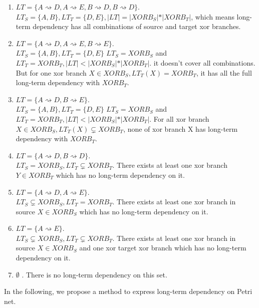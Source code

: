 \begin{enumerate}
	\item $LT=\{ A\rightsquigarrow D, A\rightsquigarrow E, B\rightsquigarrow D, B\rightsquigarrow D\}$. \\
	$LT_S = \{A,B\}, LT_T=\{D,E\}, \vert LT \vert = \vert XORB_S \vert * \vert XORB_T \vert  $, which means long-term dependency has all combinations of source and target xor branches. 
	\item $LT=\{ A\rightsquigarrow D, A\rightsquigarrow E, B\rightsquigarrow E\}. $\\
	$LT_S = \{A,B\}, LT_T=\{D,E\}$
	$LT_S = XORB_S $ and $LT_T = XORB_T, \vert LT \vert < \vert XORB_S \vert * \vert XORB_T \vert $. it doesn't cover all combinations. But for one xor branch $X \in XORB_S, LT_T(X)= XORB_T$, it has all the full long-term dependency with $XORB_T$. 
	\item $LT=\{ A\rightsquigarrow D, B\rightsquigarrow E\}. $\\
	$LT_S = \{A,B\}, LT_T=\{D,E\}$
	$LT_S = XORB_S $ and $LT_T = XORB_T, \vert LT \vert < \vert XORB_S \vert * \vert XORB_T \vert $. For all xor branch $X \in XORB_S, LT_T(X) \subsetneq XORB_T$, none of xor branch X has long-term dependency with $XORB_T$.
	\item $LT=\{ A\rightsquigarrow D, B\rightsquigarrow D\}.$ \\
	$LT_S = XORB_S ,  LT_T \subsetneq XORB_T$. There exists at least one xor branch $Y \in XORB_T$ which has no long-term dependency on it.
	\item $LT=\{ A\rightsquigarrow D, A\rightsquigarrow E\}.$ \\
	$LT_S \subsetneq XORB_S ,  LT_T = XORB_T$.
	There exists at least one xor branch in source $X \in XORB_S$ which has no long-term dependency on it.
	\item $LT=\{ A\rightsquigarrow E\}. $\\
	$LT_S \subsetneq XORB_S ,  LT_T \subsetneq XORB_T$.
	There exists at least one xor branch in source $X \in XORB_S$  and one xor target xor branch which has no long-term dependency on it.
	\item $ \emptyset$ . There is no long-term dependency on this set. 
\end{enumerate}
In the following, we propose a method to express long-term dependency on Petri net. 

